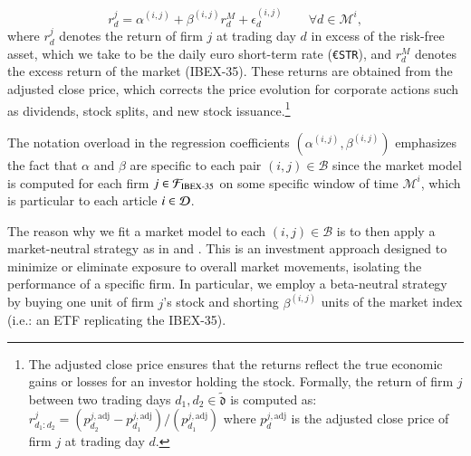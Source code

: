 $$
r_{d}^{j} = \alpha^{(i,j)} + \beta^{(i,j)} r_{d}^M + \epsilon_{ d}^{(i,j)} 
\qquad  
\forall d \in \mathcal{M}^i
,
$$
where 
$r_{d}^{j}$ denotes the return of firm $j$ at trading day $d$ in excess of the risk-free asset, which we take to be the daily euro short-term rate (\texttt{\euro STR}),
and 
$r_{d}^M$ denotes the excess return of the market (IBEX-35).  
These returns are obtained from the adjusted close price, which corrects the price evolution for corporate actions such as dividends, stock splits, and new stock issuance.\footnote{
The adjusted close price ensures that the returns reflect the true economic gains or losses for an investor holding the stock. 
%
Formally, the return of firm $j$ between two trading days $d_1, d_2\in \tilde{\mathfrak{d}}$ is computed as:
$
r_{d_1:d_2}^{j} = 
(
p_{d_2}^{j,\text{adj}} - p_{d_1}^{j,\text{adj}}
)/(
p_{d_1}^{j,\text{adj}}
)
$
where $p_{d}^{j,\text{adj}}$ is the adjusted close price of firm $j$ at trading day $d$.
}

\mx 
The notation overload in the regression coefficients $(\alpha^{(i,j)},\beta^{(i,j)})$ emphasizes the fact that $\alpha$ and $\beta$ are specific to each pair $(i,j)\in\mathcal B$ since the market model is computed for each firm $j\in\mathcal{F}_{\text{IBEX-35}}$ on some specific window of time $\mathcal{M}^i$, which is particular to each article $i\in\mathcal{D}$.

\mx 
The reason why we fit a market model to each $(i,j)\in\mathcal B$ is to then apply a market-neutral strategy as in \cite{chan2003stock} and \cite{jiang2021pervasive}. This is an investment approach designed to minimize or eliminate exposure to overall market movements, isolating the performance of a specific firm. 
% 
In particular, we employ a beta-neutral strategy by buying one unit of firm $j$'s stock and shorting $\beta^{(i,j)}$ units of the market index (i.e.: an ETF replicating the IBEX-35). 

